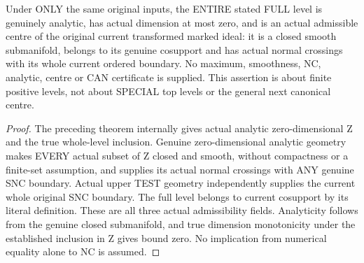 \begin{theorem}
\label{hir:original-order-cut-finite-positive-full-level-admissible}
\leanok
Under ONLY the same original inputs, the ENTIRE stated FULL level is genuinely
analytic, has actual dimension at most zero, and is an actual admissible centre
of the original current transformed marked ideal: it is a closed smooth
submanifold, belongs to its genuine cosupport and has actual normal crossings
with its whole current ordered boundary. No maximum, smoothness, NC, analytic,
centre or CAN certificate is supplied. This assertion is about finite positive
levels, not about SPECIAL top levels or the general next canonical centre.
\end{theorem}
\begin{proof}
The preceding theorem internally gives actual analytic zero-dimensional Z
and the true whole-level inclusion. Genuine zero-dimensional analytic geometry
makes EVERY actual subset of Z closed and smooth, without compactness or a
finite-set assumption, and supplies its actual normal crossings with ANY
genuine SNC boundary. Actual upper TEST geometry independently supplies the
current whole original SNC boundary. The full level belongs to current
cosupport by its literal definition. These are all three actual admissibility
fields. Analyticity follows from the genuine closed submanifold, and true
dimension monotonicity under the established inclusion in Z gives bound zero.
No implication from numerical equality alone to NC is assumed.
\end{proof}

